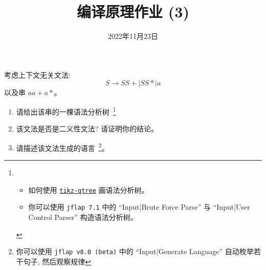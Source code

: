 \documentclass[a4paper, justified]{tufte-handout}
\title{编译原理作业 (3)}
\date{2022年11月23日}
\begin{document}
\maketitle
\noplagiarism %
\begin{abstract}
\end{abstract}
\beginrequired

\begin{problem}
  考虑上下文无关文法:
  \[
    S \to S S + \mid S S \ast \mid a
  \]
  以及串 $a a + a \ast$。

  \begin{enumerate}[(1)]
    \item 请给出该串的一棵语法分析树~\footnote{
      \begin{itemize}
        \item 如何使用 \href{https://mirrors.hit.edu.cn/CTAN/graphics/pgf/contrib/tikz-qtree/tikz-qtree-manual.pdf}{\texttt{tikz-qtree}} 画语法分析树。
        \item 你可以使用 \texttt{jflap 7.1} 中的 ``Input|Brute Force Parse'' 与 ``Input|User Control Parser'' 构造语法分析树。
      \end{itemize}}
    \item 该文法是否是二义性文法? 请证明你的结论。
    \item 请描述该文法生成的语言~\footnote{你可以使用 \texttt{jflap v8.0 (beta)} 中的 ``Input|Generate Language'' 自动枚举若干句子, 然后观察规律}。
  \end{enumerate}
\end{problem}
\end{document}
